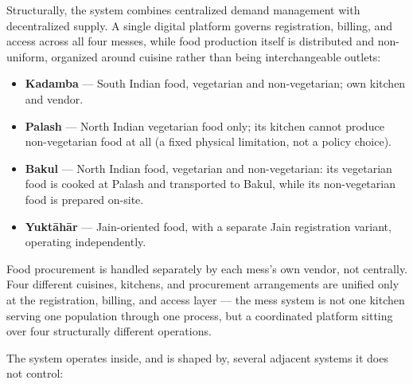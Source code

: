 \documentclass[11pt]{article}
\begin{document}
Structurally, the system combines centralized demand management with decentralized
supply. A single digital platform governs registration, billing, and access across
all four messes, while food production itself is distributed and non-uniform,
organized around cuisine rather than being interchangeable outlets:

\begin{itemize}
    \item \textbf{Kadamba} --- South Indian food, vegetarian and non-vegetarian; own
        kitchen and vendor.
    \item \textbf{Palash} --- North Indian vegetarian food only; its kitchen cannot
        produce non-vegetarian food at all (a fixed physical limitation, not a policy
        choice).
    \item \textbf{Bakul} --- North Indian food, vegetarian and non-vegetarian: its
        vegetarian food is cooked at Palash and transported to Bakul, while its
        non-vegetarian food is prepared on-site.
    \item \textbf{Yukt\={a}h\={a}r} --- Jain-oriented food, with a separate Jain
        registration variant, operating independently.
\end{itemize}

Food procurement is handled separately by each mess's own vendor, not centrally.
Four different cuisines, kitchens, and procurement arrangements are unified only at
the registration, billing, and access layer --- the mess system is not one kitchen
serving one population through one process, but a coordinated platform sitting over
four structurally different operations.

The system operates inside, and is shaped by, several adjacent systems it does not
control:
\end{document}
